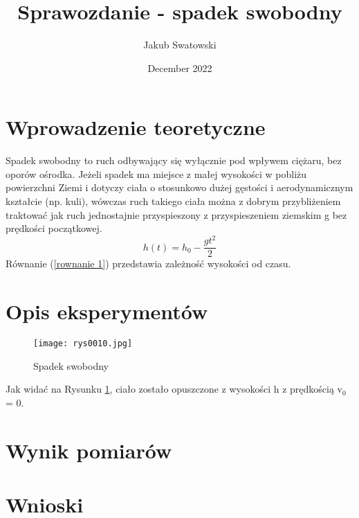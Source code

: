 \documentclass{article}
\title{Sprawozdanie - spadek swobodny}
\author{Jakub Swatowski}
\date{December 2022}
\begin{document}
\maketitle

\section{Wprowadzenie teoretyczne}
Spadek swobodny to ruch odbywający się wyłącznie pod wpływem ciężaru, bez oporów ośrodka. Jeżeli spadek ma miejsce z małej wysokości w pobliżu powierzchni Ziemi i dotyczy ciała o stosunkowo dużej gęstości i aerodynamicznym kształcie (np. kuli), wówczas ruch takiego ciała można z dobrym przybliżeniem traktować jak ruch jednostajnie przyspieszony z przyspieszeniem ziemskim g bez prędkości początkowej.
\begin{equation}
   h(t) = h_0 - \frac{gt^2}{2}
   \label{rownanie 1}
\end{equation}
Równanie (\ref{rownanie 1}) przedstawia zależność wysokości od czasu.

\section{Opis eksperymentów}
\begin{figure}[htb]
    \texttt{[image: rys0010.jpg]}
    \centering
    \caption{Spadek swobodny}
    \label{rysunek 1}
\end{figure}
\begin{flushleft}
Jak widać na Rysunku \ref{rysunek 1}, ciało zostało opuszczone z wysokości h z prędkością v$_0$ = 0.
\end{flushleft}

\section{Wynik pomiarów}

\section{Wnioski}
\end{document}
